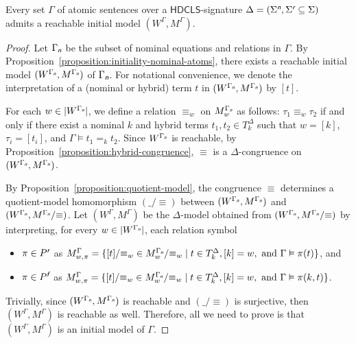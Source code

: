 \documentclass[a4paper,UKenglish,cleveref, autoref]{lipics-v2019}
\newcommand{\HDCLS}{{\mathsf{HDCLS}}}
\renewcommand{\models}{\vDash}
\newcommand{\keyscript}[1]{\text{\normalfont\sffamily\itshape #1}}
\newcommand{\nominal}{\keyscript{n}}
\newcommand{\rigid}{\keyscript{r}}
\newcommand{\flexible}{\keyscript{f}}
\begin{document}
\begin{theorem} 
  \label{theorem:initiality-atoms}
  Every set\/ \(\Gamma\) of atomic sentences over a \(\HDCLS\)-signature \(\Delta = (\Sigma^{\nominal}, \Sigma^{\rigid} \subseteq \Sigma)\) admits a reachable initial model \((W^{\Gamma}, M^{\Gamma})\).
\end{theorem}
\begin{proof}
  Let \(\Gamma_{\nominal}\) be the subset of nominal equations and relations in \(\Gamma\).
  By Proposition~\ref{proposition:initiality-nominal-atoms}, there exists a reachable initial model \((W^{\Gamma_{\nominal}}, M^{\Gamma_{\nominal}})\) of \(\Gamma_{\nominal}\).
  For notational convenience, we denote the interpretation of a (nominal or hybrid) term \(t\) in \((W^{\Gamma_{\nominal}}, M^{\Gamma_{\nominal}})\) by \([t]\).

  For each \(w \in |W^{\Gamma_{\nominal}}|\), we define a relation \(\equiv_{w}\) on \(M^{\Gamma_{\nominal}}_{w}\) as follows:
  \(\tau_{1} \equiv_{w} \tau_{2}\) if and only if there exist a nominal \(k\) and hybrid terms \(t_{1}, t_{2} \in T^{\Delta}_{k}\) such that \(w = [k]\), \(\tau_{i} = [t_{i}]\), and \(\Gamma \models t_{1} =_{k} t_{2}\).
  Since $W^{\Gamma_\nominal}$ is reachable, by Proposition~\ref{proposition:hybrid-congruence}, \(\equiv\) is a \(\Delta\)-congruence on \((W^{\Gamma_{\nominal}}, M^{\Gamma_{\nominal}})\).

  By Proposition~\ref{proposition:quotient-model}, the congruence \(\equiv\) determines a quotient-model homomorphism \((\_ /{\equiv})\) between  \((W^{\Gamma_{\nominal}}, M^{\Gamma_{\nominal}})\) and \((W^{\Gamma_{\nominal}}, M^{\Gamma_{\nominal}}/{\equiv})\).
  Let \((W^{\Gamma}, M^{\Gamma})\) be the \(\Delta\)-model obtained from \((W^{\Gamma_{\nominal}}, M^{\Gamma_{\nominal}}/{\equiv})\) by interpreting, for every \(w \in |W^{\Gamma_{\nominal}}|\), each relation symbol
  \begin{itemize}
  \item \(\pi \in P^{\rigid}\) as \(M^{\Gamma}_{w, \pi} = \{[t]/{\equiv_{w}} \in M^{\Gamma_{\nominal}}_{w}/{\equiv_{w}} \mid t \in T^{\Delta}_{k}, [k] = w,\ \text{and}\ \Gamma \models \pi(t)\}\), and
  \item \(\pi \in P^{\flexible}\) as \(M^{\Gamma}_{w, \pi} = \{[t]/{\equiv_{w}} \in M^{\Gamma_{\nominal}}_{w}/{\equiv_{w}} \mid t \in T^{\Delta}_{k}, [k] = w,\ \text{and}\ \Gamma \models \pi(k, t)\}\).
  \end{itemize}
  Trivially, since \((W^{\Gamma_{\nominal}}, M^{\Gamma_{\nominal}})\) is reachable and \((\_ /{\equiv})\) is surjective, then \((W^{\Gamma}, M^{\Gamma})\) is reachable as well.
  Therefore, all we need to prove is that \((W^{\Gamma}, M^{\Gamma})\) is an initial model of \(\Gamma\).


\end{proof}
\end{document}
